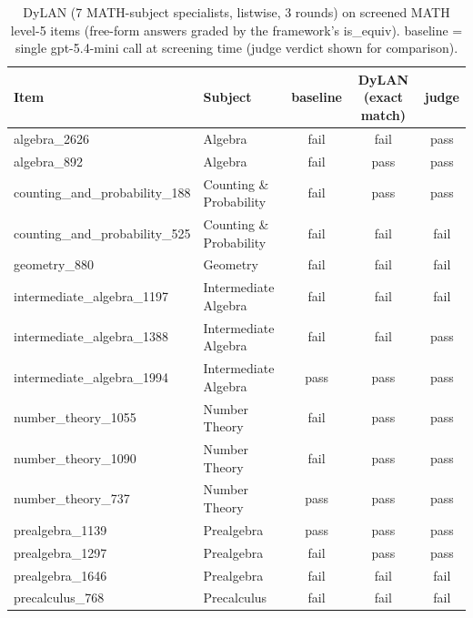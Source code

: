 \begin{table}[h]\centering\small
\begin{tabular}{llccc}\toprule
Item & Subject & baseline & DyLAN (exact match) & judge\\
\midrule
algebra\_2626 & Algebra & fail & fail & pass\\
algebra\_892 & Algebra & fail & pass & pass\\
counting\_and\_probability\_188 & Counting \& Probability & fail & pass & pass\\
counting\_and\_probability\_525 & Counting \& Probability & fail & fail & fail\\
geometry\_880 & Geometry & fail & fail & fail\\
intermediate\_algebra\_1197 & Intermediate Algebra & fail & fail & fail\\
intermediate\_algebra\_1388 & Intermediate Algebra & fail & fail & pass\\
intermediate\_algebra\_1994 & Intermediate Algebra & pass & pass & pass\\
number\_theory\_1055 & Number Theory & fail & pass & pass\\
number\_theory\_1090 & Number Theory & fail & pass & pass\\
number\_theory\_737 & Number Theory & pass & pass & pass\\
prealgebra\_1139 & Prealgebra & pass & pass & pass\\
prealgebra\_1297 & Prealgebra & fail & pass & pass\\
prealgebra\_1646 & Prealgebra & fail & fail & fail\\
precalculus\_768 & Precalculus & fail & fail & fail\\
\bottomrule\end{tabular}
\caption{DyLAN (7 MATH-subject specialists, listwise, 3 rounds) on screened MATH level-5 items (free-form answers graded by the framework's is\_equiv). baseline = single gpt-5.4-mini call at screening time (judge verdict shown for comparison).}\label{tab:dylan-math-outcomes}
\end{table}
